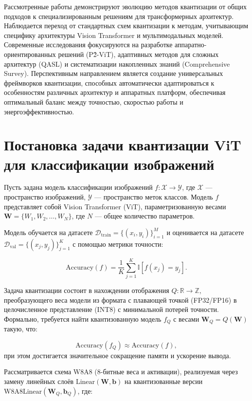 \documentclass{article}
\begin{document}
Рассмотренные работы демонстрируют эволюцию методов квантизации от общих подходов к специализированным решениям для трансформерных архитектур. Наблюдается переход от стандартных схем квантизации к методам, учитывающим специфику архитектуры Vision Transformer и мультимодальных моделей. Современные исследования фокусируются на разработке аппаратно-ориентированных решений (P\^2-ViT), адаптивных методов для сложных архитектур (QASL) и систематизации накопленных знаний (Comprehensive Survey). Перспективным направлением является создание универсальных фреймворков квантизации, способных автоматически адаптироваться к особенностям различных архитектур и аппаратных платформ, обеспечивая оптимальный баланс между точностью, скоростью работы и энергоэффективностью.

\section{Постановка задачи квантизации ViT для классификации изображений}

Пусть задана модель классификации изображений $f: \mathcal{X} \rightarrow \mathcal{Y}$, где $\mathcal{X}$ --- пространство изображений, $\mathcal{Y}$ --- пространство меток классов. Модель $f$ представляет собой Vision Transformer (ViT), параметризованную весами $\mathbf{W} = \{W_1, W_2, \dots, W_N\}$, где $N$ --- общее количество параметров.

Модель обучается на датасете $\mathcal{D}_{\text{train}} = \{(x_i, y_i)\}_{i=1}^M$ и оценивается на датасете $\mathcal{D}_{\text{val}} = \{(x_j, y_j)\}_{j=1}^K$ с помощью метрики точности:

\[
\text{Accuracy}(f) = \frac{1}{K} \sum_{j=1}^K \mathbb{I}[f(x_j) = y_j].
\]

Задача квантизации состоит в нахождении отображения $Q: \mathbb{R} \rightarrow \mathbb{Z}$, преобразующего веса модели из формата с плавающей точкой (FP32/FP16) в целочисленное представление (INT8) с минимальной потерей точности. Формально, требуется найти квантизованную модель $f_Q$ с весами $\mathbf{W}_Q = Q(\mathbf{W})$ такую, что:

\[
\text{Accuracy}(f_Q) \approx \text{Accuracy}(f),
\]
при этом достигается значительное сокращение памяти и ускорение вывода.

Рассматривается схема W8A8 (8-битные веса и активации), реализуемая через замену линейных слоёв $\text{Linear}(\mathbf{W}, \mathbf{b})$ на квантизованные версии $\text{W8A8Linear}(\mathbf{W}_Q, \mathbf{b}_Q)$, где:
\end{document}
